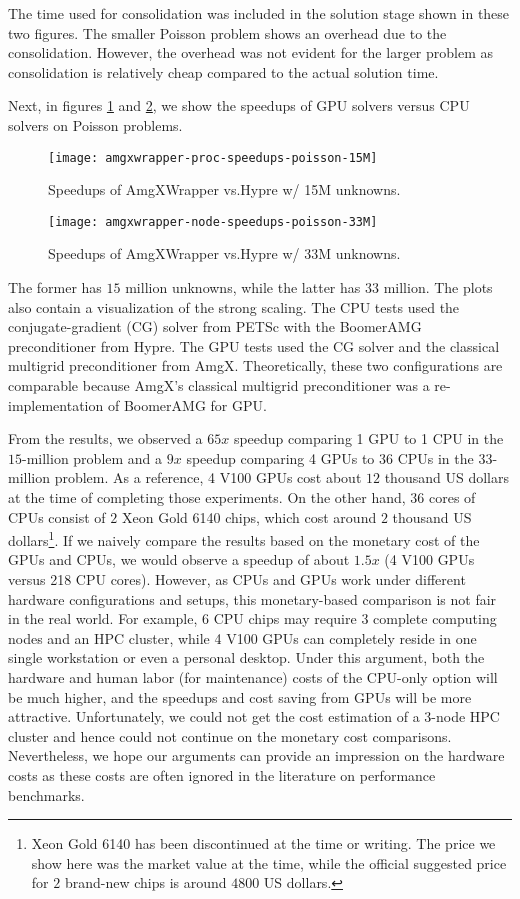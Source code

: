 The time used for consolidation was included in the solution stage shown in these two figures.
The smaller Poisson problem shows an overhead due to the consolidation.
However, the overhead was not evident for the larger problem as consolidation is relatively cheap compared to the actual solution time. 

Next, in figures \ref{fig:amgxwrapper-speedups-15M} and \ref{fig:amgxwrapper-speedups-33M}, we show the speedups of GPU solvers versus CPU solvers on Poisson problems.
\begin{figure}[hbt!]
    \texttt{[image: amgxwrapper-proc-speedups-poisson-15M]}
    \caption{Speedups of AmgXWrapper vs.\@ Hypre w/ 15M unknowns.}
    \label{fig:amgxwrapper-speedups-15M}
\end{figure}
\begin{figure}[hbt!]
    \texttt{[image: amgxwrapper-node-speedups-poisson-33M]}
    \caption{Speedups of AmgXWrapper vs.\@ Hypre w/ 33M unknowns.}
    \label{fig:amgxwrapper-speedups-33M}
\end{figure}
The former has $15$ million unknowns, while the latter has $33$ million.
The plots also contain a visualization of the strong scaling.
The CPU tests used the conjugate-gradient (CG) solver from PETSc with the BoomerAMG preconditioner from Hypre.
The GPU tests used the CG solver and the classical multigrid preconditioner from AmgX.
Theoretically, these two configurations are comparable because AmgX's classical multigrid preconditioner was a re-implementation of BoomerAMG for GPU.

From the results, we observed a $65x$ speedup comparing 1 GPU to 1 CPU in the $15$-million problem and a $9x$ speedup comparing 4 GPUs to 36 CPUs in the $33$-million problem.
As a reference, 4 V100 GPUs cost about $12$ thousand US dollars at the time of completing those experiments.
On the other hand, $36$ cores of CPUs consist of $2$ Xeon Gold 6140 chips, which cost around $2$ thousand US dollars\footnote{Xeon Gold 6140 has been discontinued at the time or writing. The price we show here was the market value at the time, while the official suggested price for $2$ brand-new chips is around $\num{4800}$ US dollars.}.
If we naively compare the results based on the monetary cost of the GPUs and CPUs, we would observe a speedup of about $1.5x$ (4 V100 GPUs versus 218 CPU cores).
However, as CPUs and GPUs work under different hardware configurations and setups, this monetary-based comparison is not fair in the real world.
For example, $6$ CPU chips may require $3$ complete computing nodes and an HPC cluster, while 4 V100 GPUs can completely reside in one single workstation or even a personal desktop.
Under this argument, both the hardware and human labor (for maintenance) costs of the CPU-only option will be much higher, and the speedups and cost saving from GPUs will be more attractive.
Unfortunately, we could not get the cost estimation of a 3-node HPC cluster and hence could not continue on the monetary cost comparisons.
Nevertheless, we hope our arguments can provide an impression on the hardware costs as these costs are often ignored in the literature on performance benchmarks.

